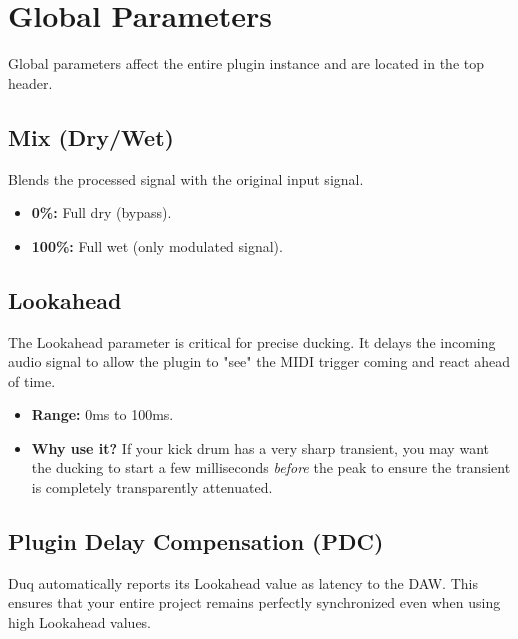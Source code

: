 \chapter{Global Parameters}
\label{ch:global_parameters}

Global parameters affect the entire plugin instance and are located in the top header.

\section{Mix (Dry/Wet)}
Blends the processed signal with the original input signal.
\begin{itemize}
    \item \textbf{0\%:} Full dry (bypass).
    \item \textbf{100\%:} Full wet (only modulated signal).
\end{itemize}

\section{Lookahead}
The Lookahead parameter is critical for precise ducking. It delays the incoming audio signal to allow the plugin to "see" the MIDI trigger coming and react ahead of time.
\begin{itemize}
    \item \textbf{Range:} 0ms to 100ms.
    \item \textbf{Why use it?} If your kick drum has a very sharp transient, you may want the ducking to start a few milliseconds \textit{before} the peak to ensure the transient is completely transparently attenuated.
\end{itemize}

\section{Plugin Delay Compensation (PDC)}
Duq automatically reports its Lookahead value as latency to the DAW. This ensures that your entire project remains perfectly synchronized even when using high Lookahead values.
